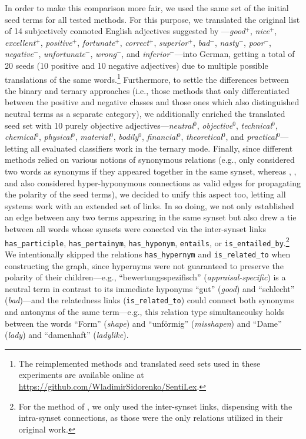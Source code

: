 In order to make this comparison more fair, we used the same set of
the initial seed terms for all tested methods.  For this purpose, we
translated the original list of 14 subjectively connoted English
adjectives suggested by \citet{Turney:03}---\emph{good}$^+$,
\emph{nice}$^+$, \emph{excellent}$^+$, \emph{positive}$^+$,
\emph{fortunate}$^+$, \emph{correct}$^+$, \emph{superior}$^+$,
\emph{bad}$^-$, \emph{nasty}$^-$, \emph{poor}$^-$,
\emph{negative}$^-$, \emph{unfortunate}$^-$, \emph{wrong}$^-$, and
\emph{inferior}$^-$---into German, getting a total of 20 seeds (10
positive and 10 negative adjectives) due to multiple possible
translations of the same words.\footnote{The reimplemented methods and
  translated seed sets used in these experiments are available online
  at \url{https://github.com/WladimirSidorenko/SentiLex}.}
Furthermore, to settle the differences between the binary and ternary
approaches (i.e., those methods that only differentiated between the
positive and negative classes and those ones which also distinguished
neutral terms as a separate category), we additionally enriched the
translated seed set with 10 purely objective
adjectives---\emph{neutral}$^0$, \emph{objective}$^0$,
\emph{technical}$^0$, \emph{chemical}$^0$, \emph{physical}$^0$,
\emph{material}$^0$, \emph{bodily}$^0$, \emph{financial}$^0$,
\emph{theoretical}$^0$, and \emph{practical}$^0$---letting all
evaluated classifiers work in the ternary mode.  Finally, since
different methods relied on various notions of synonymous relations
(e.g., \citet{Hu:04} only considered two words as synonyms if they
appeared together in the same synset, whereas \citet{Esuli:06c},
\citet{Rao:09}, and \citet{Awadallah:10} also considered
hyper-hyponymous connections as valid edges for propagating the
polarity of the seed terms), we decided to unify this aspect too,
letting all systems work with an extended set of links.  In so doing,
we not only established an edge between any two terms appearing in the
same synset but also drew a tie between all words whose synsets were
conected via the inter-synset links \texttt{has\_participle},
\texttt{has\_pertainym}, \texttt{has\_hyponym}, \texttt{entails}, or
\texttt{is\_entailed\_by}.\footnote{For the method of
  \citet{Esuli:06c}, we only used the inter-synset links, dispensing
  with the intra-synset connections, as those were the only relations
  utilized in their original work.} We intentionally skipped the
relations \texttt{has\_hypernym} and \texttt{is\_related\_to} when
constructing the graph, since hypernyms were not guaranteed to
preserve the polarity of their children---e.g.,
``bewertungsspezifisch'' (\emph{appraisal-specific}) is a neutral term
in contrast to its immediate hyponyms ``gut'' (\emph{good}) and
``schlecht'' (\emph{bad})---and the relatedness links
(\texttt{is\_related\_to}) could connect both synonyms and antonyms of
the same term---e.g., this relation type simultaneoulsy holds between
the words ``Form'' (\emph{shape}) and ``unf\"ormig''
(\emph{misshapen}) and ``Dame'' (\emph{lady}) and ``damenhaft''
(\emph{ladylike}).

